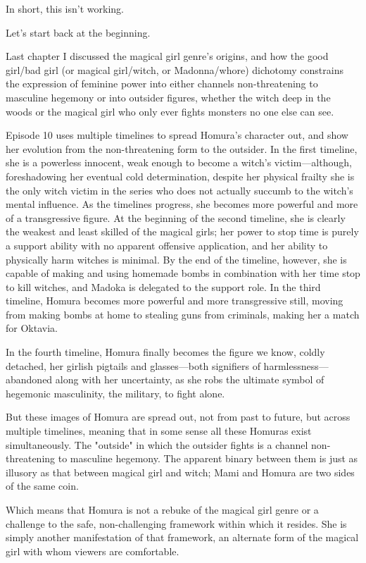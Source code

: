 In short, this isn't working.

Let's start back at the beginning.

Last chapter I discussed the magical girl genre's origins, and how the good girl/bad girl (or magical girl/witch, or Madonna/whore) dichotomy constrains the expression of feminine power into either channels non-threatening to masculine hegemony or into outsider figures, whether the witch deep in the woods or the magical girl who only ever fights monsters no one else can see.

Episode 10 uses multiple timelines to spread Homura's character out, and show her evolution from the non-threatening form to the outsider. In the first timeline, she is a powerless innocent, weak enough to become a witch's victim—although, foreshadowing her eventual cold determination, despite her physical frailty she is the only witch victim in the series who does not actually succumb to the witch's mental influence. As the timelines progress, she becomes more powerful and more of a transgressive figure. At the beginning of the second timeline, she is clearly the weakest and least skilled of the magical girls; her power to stop time is purely a support ability with no apparent offensive application, and her ability to physically harm witches is minimal. By the end of the timeline, however, she is capable of making and using homemade bombs in combination with her time stop to kill witches, and Madoka is delegated to the support role. In the third timeline, Homura becomes more powerful and more transgressive still, moving from making bombs at home to stealing guns from criminals, making her a match for Oktavia.

In the fourth timeline, Homura finally becomes the figure we know, coldly detached, her girlish pigtails and glasses—both signifiers of harmlessness—abandoned along with her uncertainty, as she robs the ultimate symbol of hegemonic masculinity, the military, to fight alone.

But these images of Homura are spread out, not from past to future, but across multiple timelines, meaning that in some sense all these Homuras exist simultaneously. The "outside" in which the outsider fights is a channel non-threatening to masculine hegemony. The apparent binary between them is just as illusory as that between magical girl and witch; Mami and Homura are two sides of the same coin.

Which means that Homura is not a rebuke of the magical girl genre or a challenge to the safe, non-challenging framework within which it resides. She is simply another manifestation of that framework, an alternate form of the magical girl with whom viewers are comfortable.

